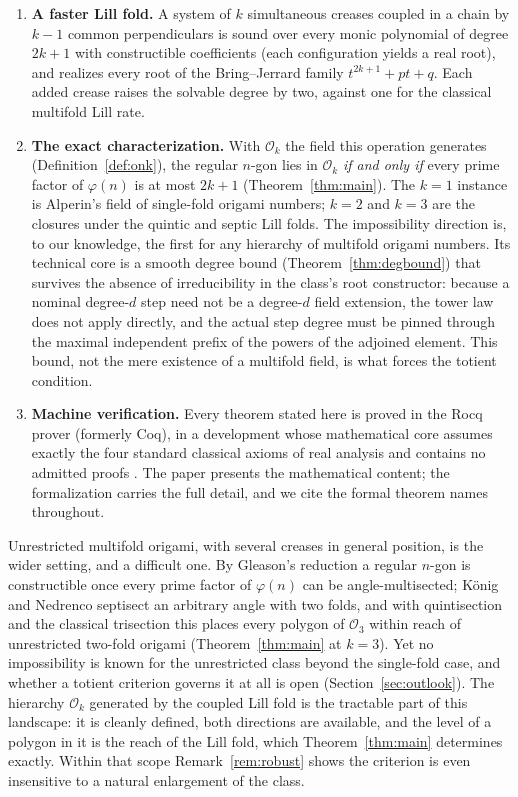 \documentclass[11pt]{amsart}
\theoremstyle{plain}
\theoremstyle{definition}
\newcommand{\Ok}{\mathscr{O}_k}
\newcommand{\Onum}[1]{\mathscr{O}_{#1}}
\begin{document}
\begin{enumerate}
\item \textbf{A faster Lill fold.} A system of $k$ simultaneous creases coupled in a chain by $k-1$ common perpendiculars is sound over every monic polynomial of degree $2k+1$ with constructible coefficients (each configuration yields a real root), and realizes every root of the Bring--Jerrard family $t^{2k+1}+pt+q$. Each added crease raises the solvable degree by two, against one for the classical multifold Lill rate.

\item \textbf{The exact characterization.} With $\Ok$ the field this operation generates (Definition~\ref{def:onk}), the regular $n$-gon lies in $\Ok$ \emph{if and only if} every prime factor of $\varphi(n)$ is at most $2k+1$ (Theorem~\ref{thm:main}). The $k=1$ instance is Alperin's field of single-fold origami numbers; $k=2$ and $k=3$ are the closures under the quintic and septic Lill folds. The impossibility direction is, to our knowledge, the first for any hierarchy of multifold origami numbers. Its technical core is a smooth degree bound (Theorem~\ref{thm:degbound}) that survives the absence of irreducibility in the class's root constructor: because a nominal degree-$d$ step need not be a degree-$d$ field extension, the tower law does not apply directly, and the actual step degree must be pinned through the maximal independent prefix of the powers of the adjoined element. This bound, not the mere existence of a multifold field, is what forces the totient condition.

\item \textbf{Machine verification.} Every theorem stated here is proved in the Rocq prover (formerly Coq), in a development whose mathematical core assumes exactly the four standard classical axioms of real analysis and contains no admitted proofs \cite{repo}. The paper presents the mathematical content; the formalization carries the full detail, and we cite the formal theorem names throughout.
\end{enumerate}

Unrestricted multifold origami, with several creases in general position, is the wider setting, and a difficult one. By Gleason's reduction \cite{gleason} a regular $n$-gon is constructible once every prime factor of $\varphi(n)$ can be angle-multisected; K\"onig and Nedrenco \cite{koenig} septisect an arbitrary angle with two folds, and with quintisection \cite{nishimura, luceroquintic} and the classical trisection this places every polygon of $\Onum{3}$ within reach of unrestricted two-fold origami (Theorem~\ref{thm:main} at $k=3$). Yet no impossibility is known for the unrestricted class beyond the single-fold case, and whether a totient criterion governs it at all is open (Section~\ref{sec:outlook}). The hierarchy $\Ok$ generated by the coupled Lill fold is the tractable part of this landscape: it is cleanly defined, both directions are available, and the level of a polygon in it is the reach of the Lill fold, which Theorem~\ref{thm:main} determines exactly. Within that scope Remark~\ref{rem:robust} shows the criterion is even insensitive to a natural enlargement of the class.
\end{document}
